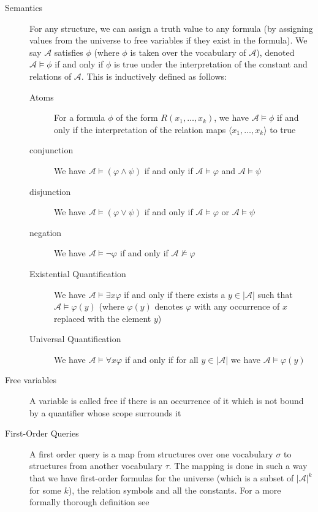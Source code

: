 \begin{description}
\begin{description}
    \end{description}
    \item[Semantics] For any structure, we can assign a truth value to any formula (by assigning values from the universe to free variables if they exist in the formula).
    We say $\mathcal{A}$ satisfies $\phi$ (where $\phi$ is taken over the vocabulary of $\mathcal{A}$), denoted $\mathcal{A} \models \phi$ if and only if $\phi$ is true under the interpretation of the constant and relations of $\mathcal{A}$.
    This is inductively defined as follows:
    \begin{description}
        \item[Atoms] For a formula $\phi$ of the form $R(x_1, \dots, x_k)$, we have $\mathcal{A} \models \phi$ if and only if the interpretation of the relation maps $\langle x_1, \dots, x_k \rangle$ to true
        \item[conjunction] We have $\mathcal{A} \models (\varphi \land \psi)$ if and only if $\mathcal{A} \models \varphi$ and $\mathcal{A} \models \psi$
        \item[disjunction]  We have $\mathcal{A} \models (\varphi \lor \psi)$ if and only if $\mathcal{A} \models \varphi$ or $\mathcal{A} \models \psi$
        \item[negation] We have $\mathcal{A} \models \lnot \varphi$ if and only if $\mathcal{A} \not\models \varphi$
        \item[Existential Quantification] We have $\mathcal{A} \models \exists x\varphi$ if and only if there exists a $y \in |\mathcal{A}|$ such that $\mathcal{A} \models \varphi(y)$ (where $\varphi(y)$ denotes $\varphi$ with any occurrence of $x$ replaced with the element $y$)
        \item[Universal Quantification] We have $\mathcal{A} \models \forall x\varphi$ if and only if for all $y \in |\mathcal{A}|$ we have $\mathcal{A} \models \varphi(y)$
    \end{description}
    \item[Free variables] A variable is called free if there is an occurrence of it which is not bound by a quantifier whose scope surrounds it
    \item[First-Order Queries] A first order query is a map from structures over one vocabulary $\sigma$ to structures from another vocabulary $\tau$.
    The mapping is done in such a way that we have first-order formulas for the universe (which is a subset of $|\mathcal{A}|^k$ for some $k$), the relation symbols and all the constants.
    For a more formally thorough definition see~\cite{descriptive-complexity}

\end{description}
